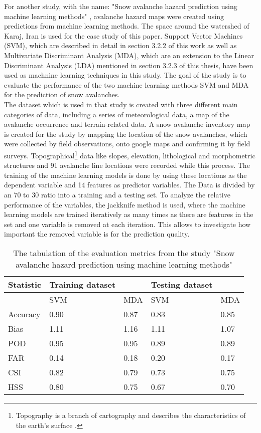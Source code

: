 \documentclass[../masterarbeit.tex]{subfiles}
\begin{document}
For another study, with the name: "Snow avalanche hazard prediction using machine learning methods" \textcite[]{Bahram:2019}, avalanche hazard maps were created using predictions from machine learning methods. The space around the watershed of Karaj, Iran is used for the case study of this paper. Support Vector Machines (SVM), which are described in detail in section 3.2.2 of this work as well as Multivariate Discriminant Analysis (MDA), which are an extension to the Linear Discriminant Analysis (LDA) mentioned in section 3.2.3 of this thesis, have been used as machnine learning techniques in this study. The goal of the study is to evaluate the performance of the two machine learning methods SVM and MDA for the prediction of snow avalanches. \autocite[]{Bahram:2019} \\
The dataset which is used in that study is created with three different main categories of data, including a series of meteorological data, a map of the avalanche occurrence and terrain-related data. A snow avalanche inventory map is created for the study by mapping the location of the snow avalanches, which were collected by field observations, onto google maps and confirming it by field surveys. Topographical\footnote{Topography is a branch of cartography and describes the characteristics of the earth's surface \textcite[]{wortbedeutung_topografie:2022}.} data like slopes, elevation, lithological and morphometric structures and 91 avalanche line locations were recorded while this process. The training of the machine learning models is done by using these locations as the dependent variable and 14 features as predictor variables. The Data is divided by an 70 to 30 ratio into a training and a testing set. To analyze the relative performance of the variables, the jackknife method is used, where the machine learning models are trained iteratively as many times as there are features in the set and one variable is removed at each iteration. This allows to investigate how important the removed variable is for the prediction quality. \autocite[]{Bahram:2019} \\
\begin{table}
    \centering
    \begin{tabular}{|l|l|l|l|l|}
    \hline
        Statistic & Training dataset & ~ & Testing dataset & ~ \\ \hline
        ~ & SVM & MDA & SVM & MDA \\ \hline
        Accuracy & 0.90 & 0.87 & 0.83 & 0.85 \\ \hline
        Bias & 1.11 & 1.16 & 1.11 & 1.07 \\ \hline
        POD & 0.95 & 0.95 & 0.89 & 0.89 \\ \hline
        FAR & 0.14 & 0.18 & 0.20 & 0.17 \\ \hline
        CSI & 0.82 & 0.79 & 0.73 & 0.75 \\ \hline
        HSS & 0.80 & 0.75 & 0.67 & 0.70 \\ \hline
    \end{tabular}
    \caption{The tabulation of the evaluation metrics from the study "Snow avalanche hazard prediction using machine learning methods"}
\end{table}
\end{document}
